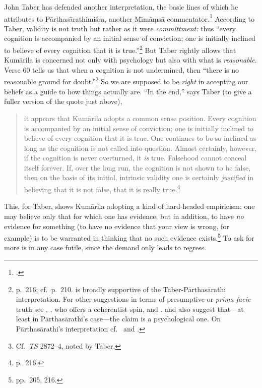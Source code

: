 ﻿\documentclass[11pt]{amsart}
\begin{document}
John Taber has defended another interpretation, the basic lines of which he attributes to P\=arthas\=arathimi\'sra, another M\={\i}m\=a\d ms\=a commentator.\footnote{\citet{taber1992dkb}.} According to Taber, validity is not truth but rather as it were \emph{committment:} thus ``every cognition is accompanied by an initial sense of conviction; one is initially inclined to believe of every cognition that it is true.''\footnote{p.~216; cf.~p.~210. \cite{arnold2001ivr, arnold2001ivs} is broadly supportive of the Taber-P\=arthas\=arathi interpretation. For other suggestions in terms of presumptive or \emph{prima facie} truth see \citet[p.~18]{keith1921karma}, \citet[pp.~372--5]{dasgupta1957history}, who offers a coherentist spin, and \citet[p.~131ff.]{bhatt1962epistemology}. \citet[p.~52]{chatterjea2003svatah} and \citet[p.~8]{mohanty1989gangesa} also suggest that---at least in P\=arthas\=arathi's case---the claim is a psychological one. On P\=arthas\=arathi's interpretation cf.~\citet[pp.~50--55]{chatterjea2003svatah} and \citet[pp.~129--45]{bhatt1962epistemology}.} But Taber rightly allows that Kum\=arila is concerned not only with psychology but also with what is \emph{reasonable}. Verse 60 tells us that when a cognition is not undermined, then ``there is no reasonable ground for doubt.''\footnote{Cf.~\emph{TS} 2872--4, noted by Taber.} So we are supposed to be \emph{right} in accepting our beliefs as a guide to how things actually are. ``In the end,'' says Taber (to give a fuller version of the quote just above),\small \begin{quote}it appears that Kum\=arila adopts a common sense position. Every cognition is accompanied by an initial sense of conviction; one is initially inclined to believe of every cognition that it is true. One continues to be so inclined as long as the cognition is not called into question. Almost certainly, however, if the cognition is never overturned, it \emph{is} true. Falsehood cannot conceal itself forever. If, over the long run, the cognition is not shown to be false, then on the basis of its initial, intrinsic validity one is certainly \emph{justified} in believing that it is not false, that it is really true.\footnote{p.~216.}\end{quote}\normalsize This, for Taber, shows Kum\=arila adopting a kind of hard-headed empiricism: one may believe only that for which one has evidence; but in addition, to have \emph{no} evidence for something (to have no evidence that your view is wrong, for example) is to be warranted in thinking that no such evidence exists.\footnote{pp.~205, 216.} To ask for more is in any case futile, since the demand only leads to regress.
\end{document}
